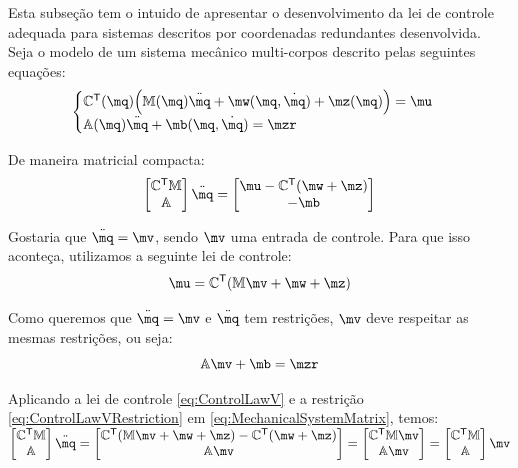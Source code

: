 \documentclass[a4paper,11pt,brazil,fleqn]{article}
\begin{document}
Esta subse\c{c}\~ao tem o intuido de apresentar o desenvolvimento da lei de controle adequada para sistemas descritos por coordenadas redundantes desenvolvida. \\

Seja o modelo de um sistema mec\^anico multi-corpos descrito pelas seguintes equa\c{c}\~oes:
\begin{equation} \label{eq:MechanicalSystem}
\begin{cases}
\mC^\msT (\mq) \Big( \mM (\mq) \ddot{\mq} + \mw (\mq, \dot{\mq}) + \mz (\mq) \Big) = \mu \\
\mA (\mq) \ddot{\mq} + \mb (\mq, \dot{\mq}) = \mzr
\end{cases}
\end{equation}

De maneira matricial compacta:
\begin{equation} \label{eq:MechanicalSystemMatrix}
\begin{bmatrix}
\mC^\msT \mM \\
\mA
\end{bmatrix}
\ddot{\mq}
=
\begin{bmatrix}
\mu - \mC^\msT(\mw + \mz) \\
-\mb
\end{bmatrix}
\end{equation}

Gostaria que $ \ddot{\mq} = \mv $, sendo $\mv$ uma entrada de controle. Para que isso aconte\c{c}a, utilizamos a seguinte lei de controle:
\begin{equation} \label{eq:ControlLawV}
\mu = \mC^\msT ( \mM \mv + \mw + \mz )
\end{equation}

Como queremos que $ \ddot{\mq} = \mv $ e $\ddot{\mq}$ tem restri\c{c}\~oes, $\mv$ deve respeitar as mesmas restri\c{c}\~oes, ou seja:
\begin{equation} \label{eq:ControlLawVRestriction}
\mA \mv + \mb = \mzr
\end{equation}

Aplicando a lei de controle \eqref{eq:ControlLawV} e a restri\c{c}\~ao \eqref{eq:ControlLawVRestriction} em \eqref{eq:MechanicalSystemMatrix}, temos: \\

$ \begin{bmatrix}
\mC^\msT \mM \\
\mA
\end{bmatrix}
\ddot{\mq}
=
\begin{bmatrix}
\mC^\msT ( \mM \mv + \mw + \mz ) - \mC^\msT(\mw + \mz) \\
\mA \mv
\end{bmatrix}
=
\begin{bmatrix}
\mC^\msT  \mM \mv \\
\mA \mv
\end{bmatrix}
=
\begin{bmatrix}
\mC^\msT \mM \\
\mA
\end{bmatrix}
\mv $ \\
\end{document}
